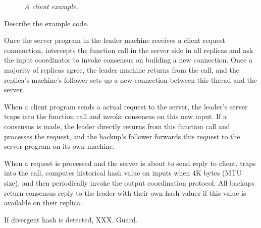 \begin{figure}[t]
\centering
\begin{minipage}{.5\textwidth}
\end{minipage}
\vspace{-.1in}
\caption{{\em A client example.}} \label{fig:client}
\vspace{-.05in}
\end{figure}


Describe the example code.

Once the server program in the leader machine receives a client request 
connenction, \xxx intercepts the \accept function call in the server side in 
all replicas and ask the input coordinator to invoke consensus on building a 
new connection. Once a majority of replicas agree, the leader machine returns 
from the \accept call, and the replica's machine's follower sets up a new
connection between this thread and the server.

When a client program sends a actual request to the server, the leader's server 
traps into the \recv function call and invoke consensus on this new input. If 
a consensus is made, the leader directly returns from this function call and 
processes the request, and the backup's follower forwards this request to the 
server program on its own machine.

When a request is processed and the server is about to send reply to client, 
\xxx traps into the \send call, computes historical hash value on inputs when 
4K bytes (MTU size), and then periodically invoke the output coordination 
protocol. All backups return consensus reply to the leader with their own hash 
values if this value is available on their replica.

If divergent hash is detected, XXX. Guard.